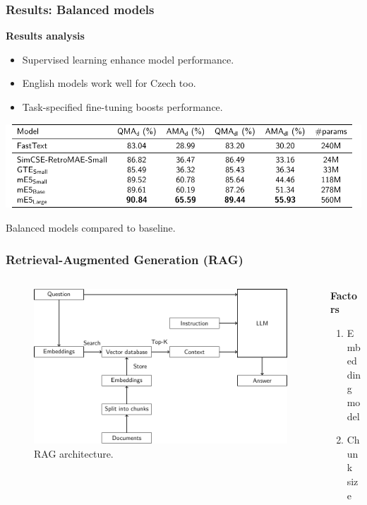 \documentclass{beamer}
\begin{document}
\begin{frame}
  \frametitle{Results: Balanced models}
  \textcolor{cvut_navy}{\textbf{Results analysis}}
  \begin{itemize}
    \item Supervised learning enhance model performance.
    \item English models work well for Czech too.    
    \item Task-specified fine-tuning boosts performance. 
  \end{itemize}
  \begin{table}
    \centering
    \includegraphics[scale=0.8]{src/fig/pdfs/tables/balanced.pdf}
    \caption{Balanced models compared to baseline.}
  \end{table}
\end{frame}


\begin{frame}
  \frametitle{Retrieval-Augmented Generation (RAG)}
  \begin{columns}[onlytextwidth,T]
    \begin{column}{0.75\textwidth}
      \begin{figure}[h]
        \includegraphics[scale=0.6]{src/fig/pdfs/tikz/RAG_scheme.pdf}
        \caption{RAG architecture.}
       \end{figure}
    \end{column}

    \begin{column}{0.75\textwidth}
      \vspace{10px}
      \textcolor{cvut_navy}{\textbf{Factors}}
      \begin{enumerate}
        \item Embedding \\model
        \item Chunk size
      \end{enumerate}
    \end{column}
  \end{columns}
\end{frame}
\end{document}
